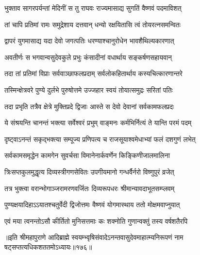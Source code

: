\twolineshloka
{भुक्ताव सागरपर्यन्तां मेदिनीं स तु राघवः}
{राज्यमासाद्य सुगतिं वैष्णवं पदमाविशत्} %

\twolineshloka
{तां चापि प्रतिमां रामः समुद्रेशाय दत्तवान्}
{धन्यो रक्षयितासि त्वं तोयरत्नसमन्वितः} %

\closesub

\twolineshloka
{द्वापरं युगमासाद्य यदा देवो जगत्पतिः}
{धरण्याश्चानुरोधेन भावशैथिल्यकारणात्} %

\twolineshloka
{अवतीर्णः स भगवान्वसुदेवकुले प्रभुः}
{कंसादीनां वधार्थाय सङ्कर्षणसहायवान्} %

\twolineshloka
{तदा तां प्रतिमां विप्राः सर्ववाञ्छाफलप्रदाम्}
{सर्वलोकहितार्थाय कस्यचित्कारणान्तरे} %

\twolineshloka
{तस्मिन्क्षेत्रवरे पुण्ये दुर्लभे पुरुषोत्तमे}
{उज्जहार स्वयं तोयात्समुद्रः सरितां पतिः} %

\twolineshloka
{तदा प्रभृति तत्रैव क्षेत्रे मुक्तिप्रदे द्विजाः}
{आस्ते स देवो देवानां सर्वकामफलप्रदः} %

\twolineshloka
{ये संश्रयन्ति चानन्तं भक्त्या सर्वेश्वरं प्रभुम्}
{वाङ्मनः कर्मभिर्नित्यं ते यान्ति परमं पदम्} %

\twolineshloka
{दृष्ट्वाऽनन्तं सकृद्‌भक्त्या सम्पूज्य प्रणिपत्य च}
{राजसूयाश्वमेधाभ्यां फलं दशगुणं लभेत्} %

\twolineshloka
{सर्वकामसमृद्धेन कामगेन सुवर्चसा}
{विमानेनार्कवर्णेन किङ्किणीजालमालिना} %

\twolineshloka
{त्रिःसप्तकुलमुद्धृत्य दिव्यस्त्रीगणसेवितः}
{उपगीयमानो गन्धर्वैर्नरो विष्णुपुरं व्रजेत्} %

\twolineshloka
{तत्र भुक्त्वा वरान्भोगाञ्जरामरणवर्जितः}
{दिव्यरूपधरः श्रीमान्यावदाभूतसम्प्लवम्} %

\twolineshloka
{पुण्यक्षयादिहाऽऽयातश्चतुर्वेदी द्विजोत्तमः}
{वैष्णवं योगमास्थाय ततो मोक्षमवाप्नुयात्} %

\twolineshloka
{एवं मया त्वनन्तोऽसौ कीर्तितो मुनिसत्तमाः}
{कः शक्नोति गुणान्वक्तुं तस्य वर्षशतैरपि} %

॥इति श्रीमहापुराणे आदिब्राह्मे स्वयम्भ्वृषिसंवादेऽनन्तवासुदेवमाहात्म्यनिरूपणं नाम षट्सप्तत्यधिकशततमोऽध्यायः॥१७६॥
